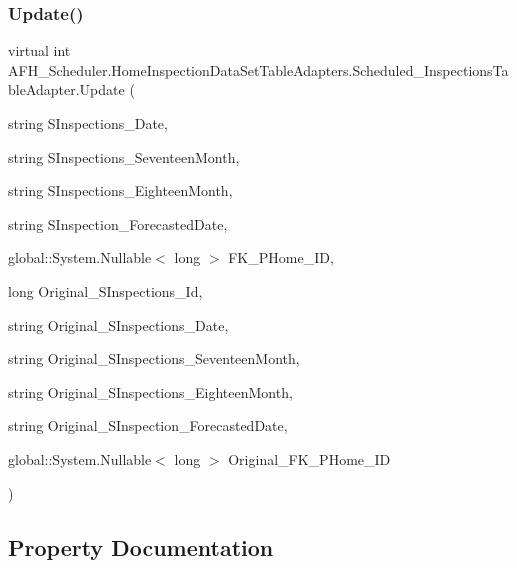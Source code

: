 \mbox{\label{class_a_f_h___scheduler_1_1_home_inspection_data_set_table_adapters_1_1_scheduled___inspections_table_adapter_a0cdd12aebd4512f616b7e812eb308b34}} 
\subsubsection{Update()\hspace{0.1cm}{\footnotesize\ttfamily [6/6]}}
{\footnotesize\ttfamily virtual int A\+F\+H\+\_\+\+Scheduler.\+Home\+Inspection\+Data\+Set\+Table\+Adapters.\+Scheduled\+\_\+\+Inspections\+Table\+Adapter.\+Update (\begin{DoxyParamCaption}\item[{string}]{S\+Inspections\+\_\+\+Date,  }\item[{string}]{S\+Inspections\+\_\+\+Seventeen\+Month,  }\item[{string}]{S\+Inspections\+\_\+\+Eighteen\+Month,  }\item[{string}]{S\+Inspection\+\_\+\+Forecasted\+Date,  }\item[{global\+::\+System.\+Nullable$<$ long $>$}]{F\+K\+\_\+\+P\+Home\+\_\+\+ID,  }\item[{long}]{Original\+\_\+\+S\+Inspections\+\_\+\+Id,  }\item[{string}]{Original\+\_\+\+S\+Inspections\+\_\+\+Date,  }\item[{string}]{Original\+\_\+\+S\+Inspections\+\_\+\+Seventeen\+Month,  }\item[{string}]{Original\+\_\+\+S\+Inspections\+\_\+\+Eighteen\+Month,  }\item[{string}]{Original\+\_\+\+S\+Inspection\+\_\+\+Forecasted\+Date,  }\item[{global\+::\+System.\+Nullable$<$ long $>$}]{Original\+\_\+\+F\+K\+\_\+\+P\+Home\+\_\+\+ID }\end{DoxyParamCaption})\hspace{0.3cm}{\ttfamily [virtual]}}



\subsection{Property Documentation}
\mbox{\label{class_a_f_h___scheduler_1_1_home_inspection_data_set_table_adapters_1_1_scheduled___inspections_table_adapter_abeaf12c74c164bf95d6bf485341b88bc}} 
